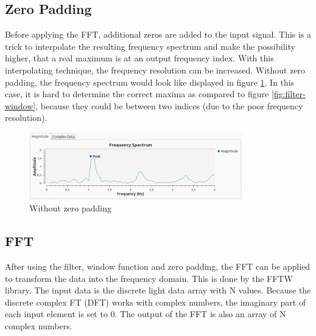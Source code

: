 \documentclass[notitlepage]{scrreprt}
\begin{document}
\subsection{Zero Padding}
\label{subsec:zp}
Before applying the FFT, additional zeros are added to the input signal. This is a trick to interpolate the resulting frequency spectrum and make the possibility higher, that a real maximum is at an output frequency index. With this interpolating technique, the frequency resolution can be increased. Without zero padding, the frequency spectrum would look like displayed in figure \ref{fig:without-zp}. In this case, it is hard to determine the correct maxima as compared to figure \ref{fig:filter-window}, because they could be between two indices (due to the poor frequency resolution).

\begin{figure}[H]
	\centering
	\includegraphics[width=350px]{images/noZeroPaddingAndWithEverythingElse.png}
	\caption{Without zero padding}
	\label{fig:without-zp}
\end{figure}

\subsection{FFT}
After using the filter, window function and zero padding, the FFT can be applied  to transform the data into the frequency domain. This is done by the FFTW library. The input data is the discrete light data array with N values. Because the discrete complex FT (DFT) works with complex numbers, the imaginary part of each input element is set to 0. The output of the FFT is also an array of N complex numbers.
\end{document}
